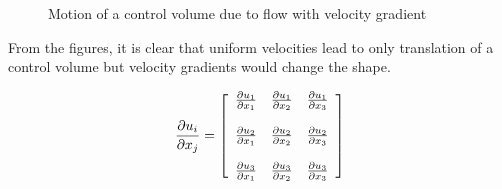
\begin{figure}[h]
\begin{center}
\end{center}
\caption{Motion of a control volume due to flow with velocity gradient}
\label{CVTranslation4}
\end{figure}

From the figures, it is clear that uniform velocities lead to only translation of a control volume but velocity gradients would change the shape.


\begin{equation*}
{\partial u_i \over \partial x_j} = 
\left[
\begin{array}{lll}
{\partial u_1 \over \partial x_1} & {\partial u_1 \over \partial x_2} & {\partial u_1 \over \partial x_3} \\
\\
{\partial u_2 \over \partial x_1} & {\partial u_2 \over \partial x_2} & {\partial u_2 \over \partial x_3} \\
\\
{\partial u_3 \over \partial x_1} & {\partial u_3 \over \partial x_2} & {\partial u_3 \over \partial x_3} \\
\end{array}
\right]
\end{equation*}

